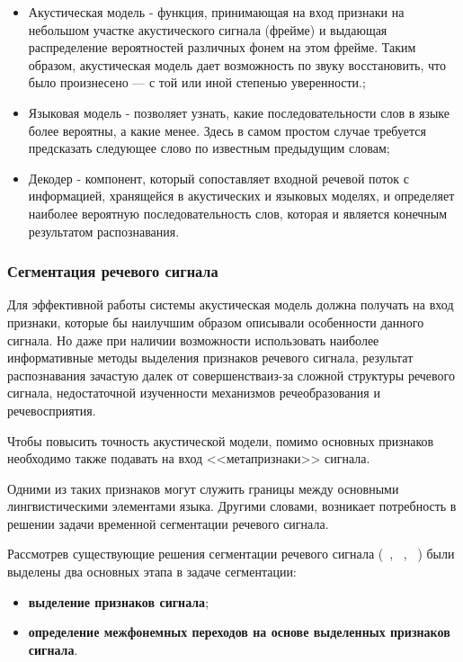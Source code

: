 \documentclass[utf8x, 14pt, oneside, a4paper]{article}
\begin{document}
	\begin{itemize}
		\item Акустическая модель - функция, принимающая на вход признаки на небольшом участке акустического сигнала (фрейме) и выдающая распределение вероятностей различных фонем на этом фрейме. Таким образом, акустическая модель дает возможность по звуку восстановить, что было произнесено — с той или иной степенью уверенности.;
		\item Языковая модель - позволяет узнать, какие последовательности слов в языке более вероятны, а какие менее. Здесь в самом простом случае требуется предсказать следующее слово по известным предыдущим словам;
		\item Декодер - компонент, который сопоставляет входной речевой поток с информацией, хранящейся в акустических и языковых моделях, и определяет наиболее вероятную последовательность слов, которая и является конечным результатом распознавания.
	\end{itemize}
	
	\subsubsection{Сегментация речевого сигнала}\label{segment}
	
	Для эффективной работы системы акустическая модель должна получать на вход признаки, которые бы наилучшим образом описывали особенности данного сигнала. Но даже при наличии возможности использовать наиболее информативные методы выделения признаков речевого сигнала, результат распознавания зачастую далек от совершенстваиз-за сложной структуры речевого сигнала, недостаточной изученности механизмов речеобразования и речевосприятия.
	
	Чтобы повысить точность акустической модели, помимо основных признаков необходимо также подавать на вход <<метапризнаки>> сигнала.
	
	Одними из таких признаков могут служить границы между основными лингвистическими элементами языка. Другими словами, возникает потребность в решении задачи временной сегментации речевого сигнала.
	
	Рассмотрев существующие решения сегментации речевого сигнала (~\cite{vevlet_1}, ~\cite{vevlet_2}, ~\cite{hilbert_huang}) были выделены два основных этапа в задаче сегментации:
	
	\begin{itemize}
		\item {\bf выделение признаков сигнала};
		\item {\bf определение межфонемных переходов на основе выделенных признаков сигнала}.
	\end{itemize}
	
\end{document}
